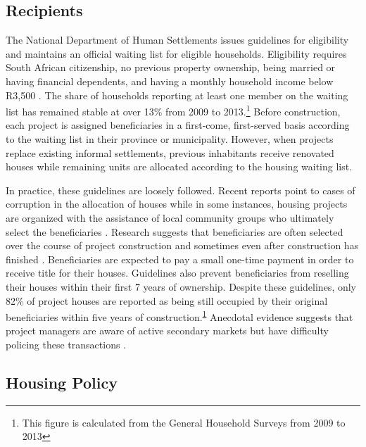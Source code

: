 \documentclass[12pt]{article}
\begin{document}
\subsection{Recipients}

The National Department of Human Settlements issues guidelines for eligibility and maintains an official waiting list for eligible households.  Eligibility requires South African citizenship, no previous property ownership, being married or having financial dependents, and having a monthly household income below R3,500 \citep{seriq}. The share of households reporting at least one member on the waiting list has remained stable at over 13\% from 2009 to 2013.\footnote{\label{GHSnote}This figure is calculated from the General Household Surveys from 2009 to 2013}  Before construction, each project is assigned beneficiaries in a first-come, first-served basis according to the waiting list in their province or municipality. However, when projects replace existing informal settlements, previous inhabitants receive renovated houses while remaining units are allocated according to the housing waiting list. %

In practice, these guidelines are loosely followed.  Recent reports point to cases of corruption in the allocation of houses while in some instances, housing projects are organized with the assistance of local community groups who ultimately select the beneficiaries \citep{seriq,casestudytinazonke}.  Research suggests that beneficiaries are often selected over the course of project construction and sometimes even after construction has finished \citep{seriq}. Beneficiaries are expected to pay a small one-time payment in order to receive title for their houses.  Guidelines also prevent beneficiaries from reselling their houses within their first 7 years of ownership.  Despite these guidelines, only 82\% of project houses are reported as being still occupied by their original beneficiaries within five years of construction.\textsuperscript{\ref{GHSnote}} Anecdotal evidence suggests that project managers are aware of active secondary markets but have difficulty policing these transactions \citep{resale}.  

\subsection{Housing Policy}
\end{document}
